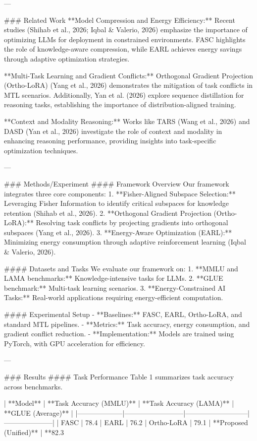 ---

### Related Work
**Model Compression and Energy Efficiency:** 
Recent studies (Shihab et al., 2026; Iqbal & Valerio, 2026) emphasize the importance of optimizing LLMs for deployment in constrained environments. FASC highlights the role of knowledge-aware compression, while EARL achieves energy savings through adaptive optimization strategies.

**Multi-Task Learning and Gradient Conflicts:** 
Orthogonal Gradient Projection (Ortho-LoRA) (Yang et al., 2026) demonstrates the mitigation of task conflicts in MTL scenarios. Additionally, Yan et al. (2026) explore sequence distillation for reasoning tasks, establishing the importance of distribution-aligned training.

**Context and Modality Reasoning:** 
Works like TARS (Wang et al., 2026) and DASD (Yan et al., 2026) investigate the role of context and modality in enhancing reasoning performance, providing insights into task-specific optimization techniques.

---

### Methods/Experiment
#### Framework Overview
Our framework integrates three core components: 
1. **Fisher-Aligned Subspace Selection:** Leveraging Fisher Information to identify critical subspaces for knowledge retention (Shihab et al., 2026).
2. **Orthogonal Gradient Projection (Ortho-LoRA):** Resolving task conflicts by projecting gradients into orthogonal subspaces (Yang et al., 2026).
3. **Energy-Aware Optimization (EARL):** Minimizing energy consumption through adaptive reinforcement learning (Iqbal & Valerio, 2026).

#### Datasets and Tasks
We evaluate our framework on:
1. **MMLU and LAMA benchmarks:** Knowledge-intensive tasks for LLMs.
2. **GLUE benchmark:** Multi-task learning scenarios.
3. **Energy-Constrained AI Tasks:** Real-world applications requiring energy-efficient computation.

#### Experimental Setup
- **Baselines:** FASC, EARL, Ortho-LoRA, and standard MTL pipelines.
- **Metrics:** Task accuracy, energy consumption, and gradient conflict reduction.
- **Implementation:** Models are trained using PyTorch, with GPU acceleration for efficiency.

---

### Results
#### Task Performance
Table 1 summarizes task accuracy across benchmarks.

| **Model**         | **Task Accuracy (MMLU)** | **Task Accuracy (LAMA)** | **GLUE (Average)** |
|--------------------|--------------------------|---------------------------|---------------------|
| FASC              | 78.4%
| EARL              | 76.2%
| Ortho-LoRA        | 79.1%
| **Proposed (Unified)** | **82.3%

